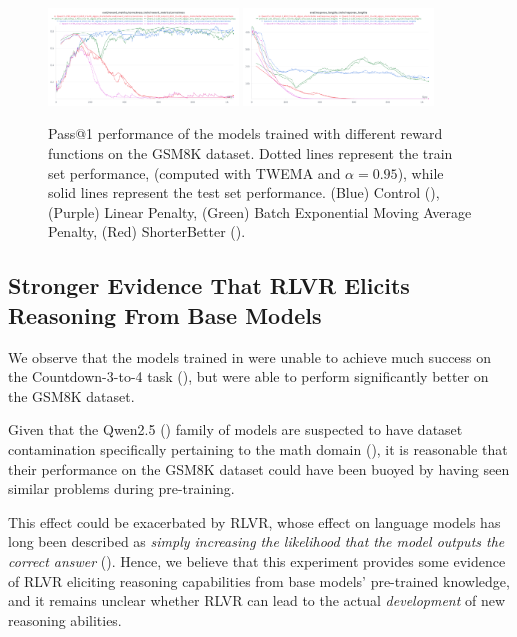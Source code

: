 \documentclass{article} %
\theoremstyle{definition}
\begin{document}
\begin{figure}
    \centering
    \includegraphics[width=0.45\textwidth,height=0.175\textheight]{images/correctness.png}
    \includegraphics[width=0.45\textwidth,height=0.175\textheight]{images/resp_lengths.png}
    \caption{Pass@1 performance of the models trained with different reward 
    functions on the GSM8K dataset.
    Dotted lines represent the train set performance,
    (computed with TWEMA and $\alpha = 0.95$),
    while solid lines represent the test set performance.
    (Blue) Control (\cite{wk10}),
    (Purple) Linear Penalty,
    (Green) Batch Exponential Moving Average Penalty,
    (Red) ShorterBetter (\cite{ShorterBetter}).
    }
    \label{fig:wk12-results}
\end{figure}

\subsection{Stronger Evidence That RLVR Elicits Reasoning From Base Models}
We observe that the models trained in \cite{wk10} were unable to achieve much success
on the Countdown-3-to-4 task (\cite{countdown}), but were able to perform significantly better on the GSM8K dataset.

Given that the Qwen2.5 (\cite{Qwen-et-al-2025}) family of models are suspected to have 
dataset contamination specifically pertaining to the math domain (\cite{unreliableresults, Liu-et-al-2025}),
it is reasonable that their performance on the GSM8K dataset could have been buoyed by having seen similar problems during pre-training.

This effect could be exacerbated by RLVR, whose effect on language models has long been described as 
\textit{simply increasing the likelihood that the model outputs the correct answer} (\cite{grpo, r1, Yue-et-al-2025}).
Hence, we believe that this experiment provides some evidence of RLVR eliciting reasoning capabilities
from base models' pre-trained knowledge, and it remains unclear whether RLVR can
lead to the actual \textit{development} of new reasoning abilities.
\end{document}
